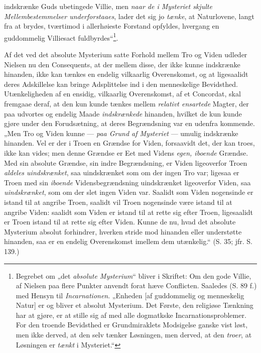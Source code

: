 \documentclass[12pt,a4paper]{book}
\newcommand{\opage}[1]{\marginnote{\footnotesize\textit{[#1]}}}
\begin{document}
indskrænke Guds ubetingede Villie, men \emph{naar de i Mysteriet skjulte Mellembestemmelser underforstaaes}, lader det sig jo \emph{tænke}, at Naturlovene, langt fra at brydes, tværtimod i
allerhøieste Forstand opfyldes, hvergang en guddommelig Villiesact fuldbyrdes“\footnote{Begrebet
om „det \emph{absolute Mysterium}“ bliver i Skriftet: Om den gode Villie, af Nielsen paa flere
Punkter anvendt forat hæve Conflicten. Saaledes (S. 89 f.) med Hensyn til \emph{Incarnationen}.
„Enheden [af guddommelig og menneskelig Natur] er og bliver et absolut Mysterium. Det Første,
den religiøse Tænkning har at gjøre, er at stille sig af med alle dogmatkske Incarnationsproblemer. For den troende Bevidsthed er Grundmiraklets Modsigelse ganske vist
løst, men ikke derved, at den selv tænker Løsningen, men derved, at den \emph{troer}, at Løsningen er \emph{tænkt} i Mysteriet.“}.

\opage{182}Af det ved det absolute Mysterium satte Forhold mellem Tro og Viden udleder Nielsen nu den
Consequents, at der mellem disse, der ikke kunne indskrænke hinanden, ikke kan tænkes en
endelig vilkaarlig Overenskomst, og at ligesaalidt deres Adskillelse kan bringe Adsplittelse
ind i den menneskelige Bevidsthed. Utænkeligheden af en ensidig, vilkaarlig Overenskomst, af
et Concordat, skal fremgaae deraf, at den kun kunde tænkes mellem \emph{relativt ensartede} Magter, der paa udvortes og endelig Maade \emph{indskrænkede} hinanden, hvilket de kun kunde gjøre
under den Forudsætning, at deres Begrændsning var en udenfra kommende. „Men Tro og Viden kunne --- \emph{paa Grund af Mysteriet} --- umulig indskrænke hinanden. Vel er der i Troen en Grændse for
Viden, forsaavidt det, der kan troes, ikke kan vides; men denne Grændse er Eet med Videns \emph{egen, iboende} Grændse. Med sin absolute Grændse, sin indre Begrændsning, er Viden ligeoverfor
Troen \emph{aldeles uindskrænket}, saa uindskrænket som om der ingen Tro var; ligesaa er Troen med
sin \emph{iboende} Vidensbegrændsning uindskrænket ligeoverfor Viden, saa \emph{uindskrænket}, som om der
slet ingen Viden var. Saalidt som Viden nogensinde er istand til at angribe Troen, saalidt vil
Troen nogensinde være istand til at angribe Viden: saalidt som Viden er istand til at rette
sig efter Troen, ligesaalidt er Troen istand til at rette sig efter Viden. Kunne de nu, hvad
det absolute Mysterium absolut forhindrer, hverken stride mod hinanden eller understøtte
hinanden, saa er en endelig Overenskomst imellem dem utænkelig.“ (S. 35; jfr. S. 139.)
\end{document}
